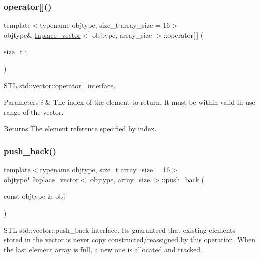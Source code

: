 \subsubsection{\texorpdfstring{operator[]()}{operator[]()}\hspace{0.1cm}{\footnotesize\ttfamily [2/2]}}
{\footnotesize\ttfamily template$<$typename objtype, size\+\_\+t array\+\_\+size = 16$>$ \\
objtype\& \mbox{\hyperlink{classInplace__vector}{Inplace\+\_\+vector}}$<$ objtype, array\+\_\+size $>$\+::operator\mbox{[}$\,$\mbox{]} (\begin{DoxyParamCaption}\item[{size\+\_\+t}]{i }\end{DoxyParamCaption})\hspace{0.3cm}{\ttfamily [inline]}}

S\+TL std\+::vector\+::operator\mbox{[}\mbox{]} interface. 
\begin{DoxyParams}{Parameters}
{\em i} & The index of the element to return. It must be within valid in-\/use range of the vector. \\
\hline
\end{DoxyParams}
\begin{DoxyReturn}{Returns}
The element reference specified by index. 
\end{DoxyReturn}
\mbox{\label{classInplace__vector_a4f5dd81d586f94279698ee31c496bcc2}} 
\subsubsection{\texorpdfstring{push\+\_\+back()}{push\_back()}}
{\footnotesize\ttfamily template$<$typename objtype, size\+\_\+t array\+\_\+size = 16$>$ \\
objtype$\ast$ \mbox{\hyperlink{classInplace__vector}{Inplace\+\_\+vector}}$<$ objtype, array\+\_\+size $>$\+::push\+\_\+back (\begin{DoxyParamCaption}\item[{const objtype \&}]{obj }\end{DoxyParamCaption})\hspace{0.3cm}{\ttfamily [inline]}}

S\+TL std\+::vector\+::push\+\_\+back interface. It\textquotesingle{}s guaranteed that existing elements stored in the vector is never copy constructed/reassigned by this operation. When the last element array is full, a new one is allocated and tracked.


